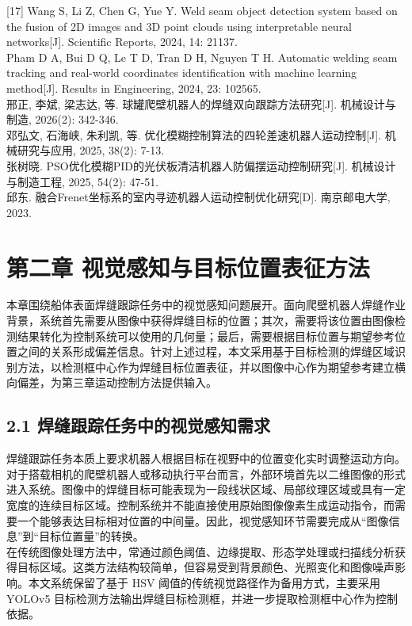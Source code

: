 \documentclass[UTF8,a4paper,12pt]{ctexrep}
\begin{document}
[17] Wang S, Li Z, Chen G, Yue Y. Weld seam object detection system based on the fusion of 2D images and 3D point clouds using interpretable neural networks[J]. Scientific Reports, 2024, 14: 21137.\\
[18] Pham D A, Bui D Q, Le T D, Tran D H, Nguyen T H. Automatic welding seam tracking and real-world coordinates identification with machine learning method[J]. Results in Engineering, 2024, 23: 102565.\\
[19] 邢正, 李斌, 梁志达, 等. 球罐爬壁机器人的焊缝双向跟踪方法研究[J]. 机械设计与制造, 2026(2): 342-346.\\
[20] 邓弘文, 石海峡, 朱利凯, 等. 优化模糊控制算法的四轮差速机器人运动控制[J]. 机械研究与应用, 2025, 38(2): 7-13.\\
[21] 张树晓. PSO优化模糊PID的光伏板清洁机器人防偏摆运动控制研究[J]. 机械设计与制造工程, 2025, 54(2): 47-51.\\
[22] 邱东. 融合Frenet坐标系的室内寻迹机器人运动控制优化研究[D]. 南京邮电大学, 2023.\\

\chapter*{第二章 视觉感知与目标位置表征方法}

本章围绕船体表面焊缝跟踪任务中的视觉感知问题展开。面向爬壁机器人焊缝作业背景，系统首先需要从图像中获得焊缝目标的位置；其次，需要将该位置由图像检测结果转化为控制系统可以使用的几何量；最后，需要根据目标位置与期望参考位置之间的关系形成偏差信息。针对上述过程，本文采用基于目标检测的焊缝区域识别方法，以检测框中心作为焊缝目标位置表征，并以图像中心作为期望参考建立横向偏差，为第三章运动控制方法提供输入。\\

\section{2.1 焊缝跟踪任务中的视觉感知需求}

焊缝跟踪任务本质上要求机器人根据目标在视野中的位置变化实时调整运动方向。对于搭载相机的爬壁机器人或移动执行平台而言，外部环境首先以二维图像的形式进入系统。图像中的焊缝目标可能表现为一段线状区域、局部纹理区域或具有一定宽度的连续目标区域。控制系统并不能直接使用原始图像像素生成运动指令，而需要一个能够表达目标相对位置的中间量。因此，视觉感知环节需要完成从“图像信息”到“目标位置量”的转换。\\

在传统图像处理方法中，常通过颜色阈值、边缘提取、形态学处理或扫描线分析获得目标区域。这类方法结构较简单，但容易受到背景颜色、光照变化和图像噪声影响。本文系统保留了基于 HSV 阈值的传统视觉路径作为备用方式，主要采用 YOLOv5 目标检测方法输出焊缝目标检测框，并进一步提取检测框中心作为控制依据。\\
\end{document}
